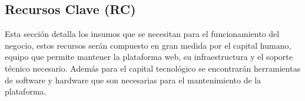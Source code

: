 {}
\subsection*{Recursos Clave (RC)}

Esta sección detalla los insumos que se necesitan para el funcionamiento del negocio, estos recursos serán compuesto en gran medida por el capital humano, equipo que permite mantener la plataforma web, su infraestructura y el soporte técnico necesario. Además para el capital tecnológico se encontrarán herramientas de software y hardware que son necesarias para el mantenimiento de la plataforma.